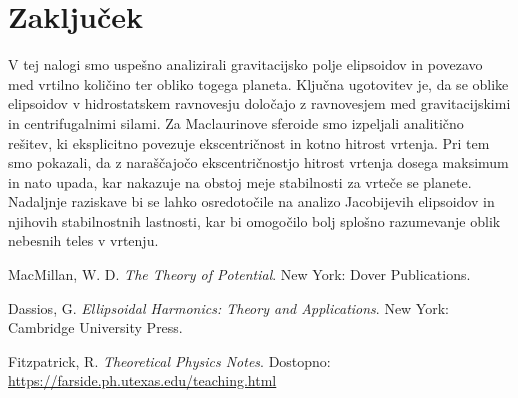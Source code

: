 \documentclass{article}
\theoremstyle{definition}
\theoremstyle{plain}
\numberwithin{definition}{section}
\numberwithin{theorem}{section}
\begin{document}

\newpage


\section{Zaključek}
V tej nalogi smo uspešno analizirali gravitacijsko polje elipsoidov in povezavo med vrtilno količino ter obliko togega planeta. Ključna ugotovitev je, da se oblike elipsoidov v hidrostatskem ravnovesju določajo z ravnovesjem med gravitacijskimi in centrifugalnimi silami. Za Maclaurinove sferoide smo izpeljali analitično rešitev, ki eksplicitno povezuje ekscentričnost in kotno hitrost vrtenja. Pri tem smo pokazali, da z naraščajočo ekscentričnostjo hitrost vrtenja dosega maksimum in nato upada, kar nakazuje na obstoj meje stabilnosti za vrteče se planete. Nadaljnje raziskave bi se lahko osredotočile na analizo Jacobijevih elipsoidov in njihovih stabilnostnih lastnosti, kar bi omogočilo bolj splošno razumevanje oblik nebesnih teles v vrtenju.




\begin{thebibliography}{9}

MacMillan, W. D. \textit{The Theory of Potential}. New York: Dover Publications.

Dassios, G. \textit{Ellipsoidal Harmonics: Theory and Applications}. New York: Cambridge University Press.

Fitzpatrick, R. \textit{Theoretical Physics Notes}. Dostopno: \url{https://farside.ph.utexas.edu/teaching.html}

\end{thebibliography}
\end{document}
